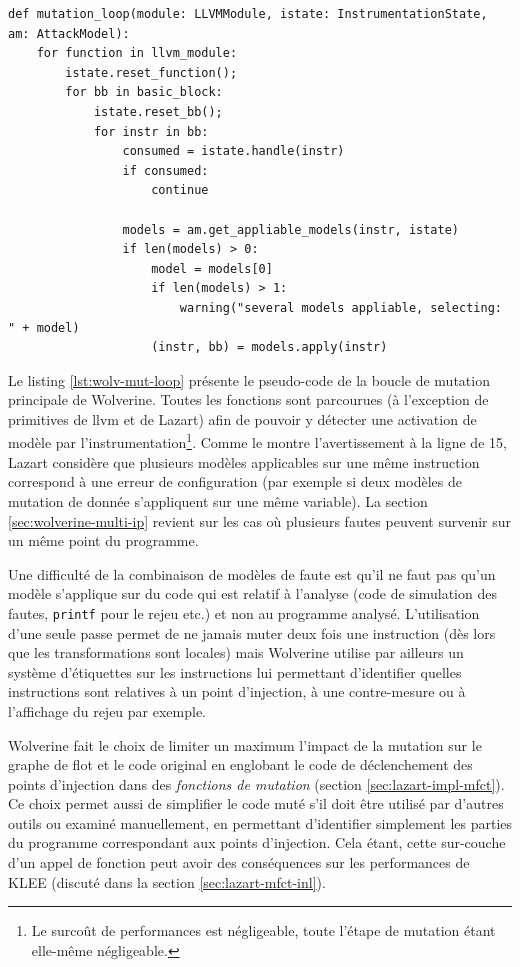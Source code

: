 \begin{lstlisting}  
def mutation_loop(module: LLVMModule, istate: InstrumentationState, am: AttackModel):
    for function in llvm_module:
        istate.reset_function();
        for bb in basic_block:
            istate.reset_bb();
            for instr in bb:
                consumed = istate.handle(instr)
                if consumed:
                    continue
                    
                models = am.get_appliable_models(instr, istate)
                if len(models) > 0:
                    model = models[0]
                    if len(models) > 1: 
                        warning("several models appliable, selecting: " + model)
                    (instr, bb) = models.apply(instr)  
\end{lstlisting}

            Le listing \ref{lst:wolv-mut-loop} présente le pseudo-code de la boucle de mutation principale de Wolverine. Toutes les fonctions sont parcourues (à l'exception de primitives de \gls{llvm} et de Lazart) afin de pouvoir y détecter une activation de modèle par l'instrumentation\footnote{Le surcoût de performances est négligeable, toute l'étape de mutation étant elle-même négligeable.}.
            Comme le montre l'avertissement à la ligne de 15, Lazart considère que plusieurs modèles applicables sur une même instruction correspond à une erreur de configuration (par exemple si deux modèles de mutation de donnée s'appliquent sur une même variable). La section \ref{sec:wolverine-multi-ip} revient sur les cas où plusieurs fautes peuvent survenir sur un même point du programme.
            
            Une difficulté de la combinaison de modèles de faute est qu'il ne faut pas qu'un modèle s'applique sur du code qui est relatif à l'analyse (code de simulation des fautes, \texttt{printf} pour le rejeu etc.) et non au programme analysé.
            L'utilisation d'une seule passe permet de ne jamais muter deux fois une instruction (dès lors que les transformations sont locales) mais Wolverine utilise par ailleurs un système d'étiquettes sur les instructions lui permettant d'identifier quelles instructions sont relatives à un point d'injection, à une contre-mesure ou à l'affichage du rejeu par exemple.
            
            Wolverine fait le choix de limiter un maximum l'impact de la mutation sur le graphe de flot et le code original en englobant le code de déclenchement des points d'injection dans des \textit{fonctions de mutation} (section \ref{sec:lazart-impl-mfct}). 
            Ce choix permet aussi de simplifier le code muté s'il doit être utilisé par d'autres outils ou examiné manuellement, en permettant d'identifier simplement les parties du programme correspondant aux points d'injection.
            Cela étant, cette sur-couche d'un appel de fonction peut avoir des conséquences sur les performances de KLEE (discuté dans la section \ref{sec:lazart-mfct-inl}). 

